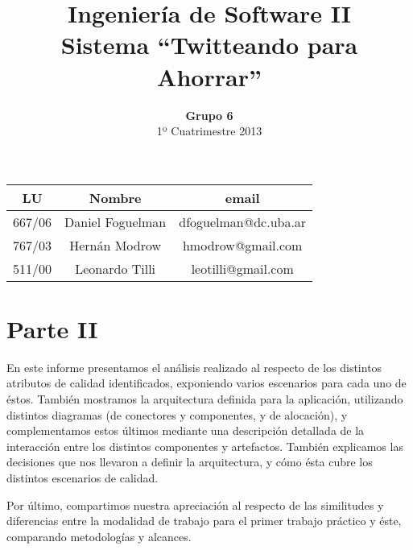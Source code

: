 \documentclass[a4paper,spanish]{article}
\title{Ingenier\'ia de Software II\\ \textbf{Sistema ``Twitteando para Ahorrar''}}
\author{\textbf{Grupo 6}\\ 1º Cuatrimestre 2013}
\date{}
\begin{document}
\maketitle
\vspace{10cm}
\begin{center}

\begin{tabular}{|c|c|c|}
\hline
\hline
\textbf{LU}&\textbf{Nombre}&\textbf{email}\\
\hline
667/06&Daniel Foguelman &dfoguelman@dc.uba.ar\\
\hline
767/03&Hern\'an Modrow&hmodrow@gmail.com\\
\hline
511/00&Leonardo Tilli&leotilli@gmail.com\\
\hline
\hline
\end{tabular}
\end{center}
\newpage

\section{Parte II}

 En este informe presentamos el an\'alisis realizado al respecto de los distintos atributos de calidad identificados, exponiendo varios escenarios para cada uno de \'estos. Tambi\'en mostramos la arquitectura definida para la aplicaci\'on, utilizando distintos diagramas (de conectores y componentes, y de alocaci\'on), y complementamos estos \'ultimos mediante una descripci\'on detallada de la interacci\'on entre los distintos componentes y artefactos. Tambi\'en explicamos las decisiones que nos llevaron a definir la arquitectura, y c\'omo \'esta cubre los distintos escenarios de calidad.
 
 Por \'ultimo, compartimos nuestra apreciaci\'on al respecto de las similitudes y diferencias entre la modalidad de trabajo para el primer trabajo pr\'actico y \'este, comparando metodolog\'ias y alcances.
 




\end{document}
